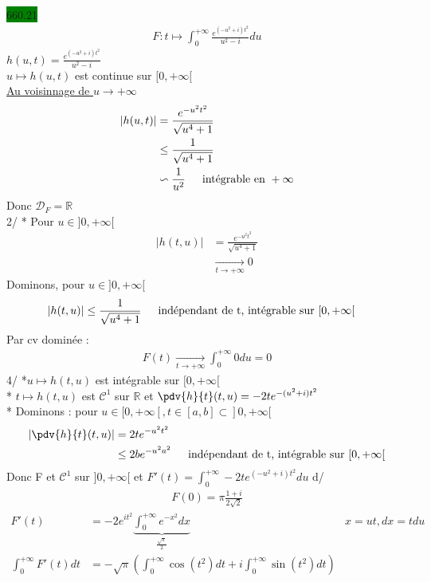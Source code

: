 \documentclass{article}
\begin{document}
\noindent \colorbox{green}{660.21}\\
\begin{align*}
    F:t \mapsto \int_{0}^{+\infty}\frac{e^{(-u^{2}+i)t^{2}}}{u^{2}-i}du   
\end{align*}
\(h(u,t) = \frac{e^{(-u^{2}+i)t^{2}}}{u^{2}-i}\)\\
\(u \mapsto h(u,t)\) est continue sur \([0, +\infty[\)\\
\underline{Au voisinnage de \(u \rightarrow +\infty\)}\\
\begin{align*}
  |h(u,t)| &= \frac{e^{-u^{2}t^{2}}}{\sqrt{u^{4}+1}}\\ 
           &\leq \frac{1}{\sqrt{u^{4}+1}}\\
           &\backsim \frac{1}{u^{2}} \indent \text{intégrable en }+\infty
\end{align*}
Donc \(\mathcal{D}_{F} = \mathbb{R}\)\\
2/ * Pour \(u \in ]0, +\infty[\)\\
\begin{align*}
  |h(t,u)| &= \frac{e^{-u^{2}t^{2}}}{\sqrt{u^{4}+1}}\\ 
           &\xrightarrow[t \to +\infty]{} 0
\end{align*}
Dominons, pour \(u \in ]0, +\infty[\)
\begin{align*}
  |h(t,u)| &\leq \frac{1}{\sqrt{u^{4}+1}} \indent \text{indépendant de t, intégrable sur }[0, +\infty[
\end{align*}
Par cv dominée : 
\begin{align*}
  F(t) \xrightarrow[t \to +\infty]{}\int_{0}^{+\infty}0 du = 0
\end{align*}
4/ *\(u \mapsto h(t,u)\) est intégrable sur \([0, +\infty[\)\\ 
* \(t \mapsto h(t,u)\) est \(\mathcal{C}^{1}\) sur \(\mathbb{R}\) et 
\(\pdv{h}{t}(t,u) = -2te^{-(u^{2}+i)t^{2}}\)\\ 
* Dominons : pour \(u \in [0, +\infty[, t \in [a,b]\subset]0, +\infty[\)
\begin{align*}
  |\pdv{h}{t}(t,u)| &= 2te^{-u^{2}t^{2}}\\ 
                    &\leq 2be^{-u^{2}a^{2}} \indent \text{indépendant de t, intégrable sur }[0, +\infty[
\end{align*}
Donc F et \(\mathcal{C}^{1}\) sur \(]0, +\infty[\) et 
\(F'(t) = \int_{0}^{+\infty}-2t e^{(-u^{2}+i)t^{2}}du\)
d/ 
\begin{align*}
    F(0) = \pi \frac{1+i}{2 \sqrt{2}}
\end{align*}
\begin{align*}
  F'(t) &= -2e^{it^{2}} \underbrace{\int_{0}^{+\infty} e^{-x^{2}}dx }_{\frac{\sqrt{\pi}}{2}} & x = ut, dx = t du \\ 
  \int_{0}^{+\infty}F'(t)dt &= -\sqrt{\pi}(\int_{0}^{+\infty}\cos(t^{2})dt + i \int_{0}^{+\infty}\sin(t^{2})dt)
\end{align*}
\end{document}
